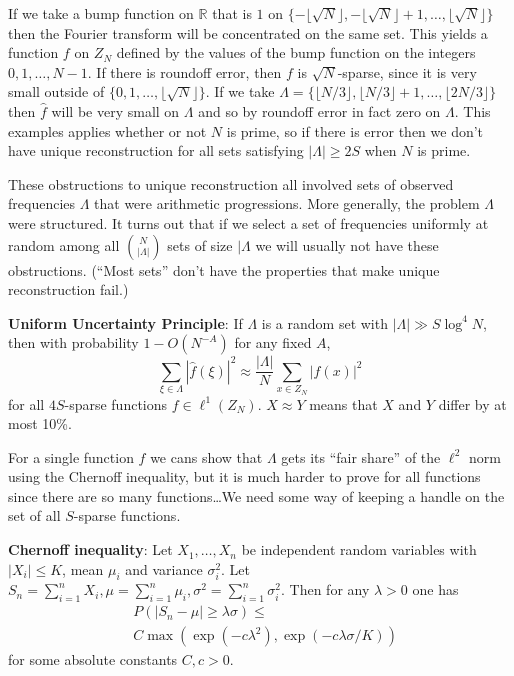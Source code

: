 \documentclass{article}
\begin{document}
If we take a bump function on $\mathbb{R}$ that is $1$
on $\{-\lfloor \sqrt{N} \rfloor, -\lfloor \sqrt{N} \rfloor+1
,\ldots,\lfloor \sqrt{N} \rfloor\}$ then
the Fourier transform will be concentrated on the same set.
This yields a function $f$ on $Z_N$ defined by the values of the bump function on
the integers $0,1,\ldots,N-1$. If there is roundoff error, then
$f$ is $\sqrt{N}$-sparse, since it is very small outside of $\{0,1,\ldots,
\lfloor \sqrt{N} \rfloor\}$. If we take $\Lambda=\{\lfloor N/3 \rfloor,
\lfloor N/3 \rfloor + 1,\ldots, \lfloor 2N/3 \rfloor\}$ then
$\hat{f}$ will be very small on $\Lambda$ and so by roundoff error
in fact zero on $\Lambda$. This examples applies whether or not
$N$ is prime, so if there is error then we don't have unique reconstruction
for all sets satisfying $|\Lambda| \geq 2S$ when $N$ is prime.

These obstructions to unique reconstruction all involved 
sets of observed frequencies $\Lambda$ that were arithmetic progressions.
More generally, the problem $\Lambda$ were structured. It turns out that
if we select a set of frequencies uniformly at random among all
$\binom{N}{|\Lambda|}$ sets of size $|\Lambda$ we will usually not
have these obstructions. (``Most sets'' don't have the properties that
make unique reconstruction fail.)

\textbf{Uniform Uncertainty Principle}: If
$\Lambda$ is a random set with $|\Lambda| \gg S\log^4 N$, then
with probability $1-O(N^{-A})$ for any fixed $A$, 
\[
\sum_{\xi \in \Lambda}|\hat{f}(\xi)|^2 \approx \frac{|\Lambda|}{N}
\sum_{x \in Z_N}|f(x)|^2
\]
for all $4S$-sparse functions $f \in \ell^1(Z_N)$. $X \approx Y$ means
that $X$ and $Y$ differ by at most 10\%.

For a single function $f$ we cans show that $\Lambda$ gets its ``fair share''
of the $\ell^2$ norm using the Chernoff inequality, but it is much harder
to prove for all functions since there are so many functions\ldots We
need some way of keeping a handle on the set of all $S$-sparse functions.

\textbf{Chernoff inequality}: Let $X_1,\ldots,X_n$ be independent
random variables with $|X_i| \leq K$, mean $\mu_i$ and variance $\sigma_i^2$.
Let $S_n=\sum_{i=1}^n X_i, \mu=\sum_{i=1}^n\mu_i, \sigma^2=\sum_{i=1}^n \sigma_i^2$.
Then for any $\lambda>0$ one has
\[
\begin{split}
&P(|S_n-\mu| \geq \lambda \sigma) \leq\\
&C\max(\exp(-c\lambda^2),\exp(-c\lambda\sigma /K))
\end{split}
\]
for some absolute constants $C,c>0$.
\end{document}
